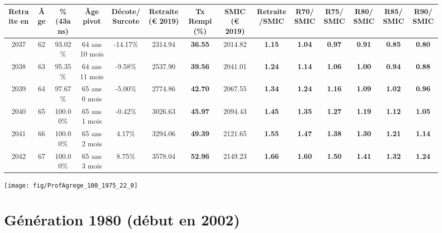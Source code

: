 \begin{adjustbox}{max width=\textwidth} 
\begin{tabular}[htb]{|c|c||c|c|c||c|c||c|c||c|c|c|c|c|} 
\hline 
 Retraite en &  Âge &  \%(43ans) &  Âge pivot &  Décote/Surcote &  Retraite (\euro{} 2019) &  Tx Rempl(\%) &  SMIC (\euro{} 2019) &  Retraite/SMIC &  R70/SMIC &  R75/SMIC &  R80/SMIC &  R85/SMIC &  R90/SMIC \\ 
\hline \hline 
 2037 &  62 &  93.02\% &  64 ans 10 mois &  -14.17\% &  2314.94 &  {\bf 36.55} &  2014.82 &  {\bf 1.15} &  {\bf 1.04} &  {\bf {\color{red} 0.97}} &  {\bf {\color{red} 0.91}} &  {\bf {\color{red} 0.85}} &  {\bf {\color{red} 0.80}} \\ 
\hline 
 2038 &  63 &  95.35\% &  64 ans 11 mois &  -9.58\% &  2537.90 &  {\bf 39.56} &  2041.01 &  {\bf 1.24} &  {\bf 1.14} &  {\bf 1.06} &  {\bf {\color{red} 1.00}} &  {\bf {\color{red} 0.94}} &  {\bf {\color{red} 0.88}} \\ 
\hline 
 2039 &  64 &  97.67\% &  65 ans 0 mois &  -5.00\% &  2774.86 &  {\bf 42.70} &  2067.55 &  {\bf 1.34} &  {\bf 1.24} &  {\bf 1.16} &  {\bf 1.09} &  {\bf 1.02} &  {\bf {\color{red} 0.96}} \\ 
\hline 
 2040 &  65 &  100.00\% &  65 ans 1 mois &  -0.42\% &  3026.63 &  {\bf 45.97} &  2094.43 &  {\bf 1.45} &  {\bf 1.35} &  {\bf 1.27} &  {\bf 1.19} &  {\bf 1.12} &  {\bf 1.05} \\ 
\hline 
 2041 &  66 &  100.00\% &  65 ans 2 mois &  4.17\% &  3294.06 &  {\bf 49.39} &  2121.65 &  {\bf 1.55} &  {\bf 1.47} &  {\bf 1.38} &  {\bf 1.30} &  {\bf 1.21} &  {\bf 1.14} \\ 
\hline 
 2042 &  67 &  100.00\% &  65 ans 3 mois &  8.75\% &  3578.04 &  {\bf 52.96} &  2149.23 &  {\bf 1.66} &  {\bf 1.60} &  {\bf 1.50} &  {\bf 1.41} &  {\bf 1.32} &  {\bf 1.24} \\ 
\hline 
\hline 
\end{tabular} 
\end{adjustbox} 
 
 \vspace{0.1cm} 

 {\hspace{-2.2cm}\texttt{[image: fig/ProfAgrege\_100\_1975\_22\_0]}} 

\newpage 
 
\section{Génération 1980 (début en 2002)\label{ProfAgrege_100_1980_22_0}} 
 
